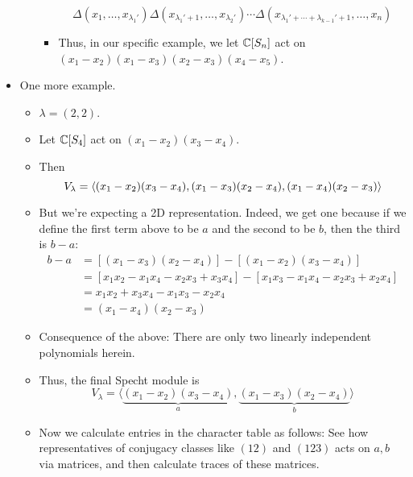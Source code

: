 \documentclass[../notes.tex]{subfiles}
\begin{document}
\begin{itemize}
\begin{itemize}
\begin{itemize}
            \begin{equation*}
                \Delta(x_1,\dots,x_{\lambda_1'})\Delta(x_{\lambda_1'+1},\dots,x_{\lambda_2'})\cdots\Delta(x_{\lambda_1'+\cdots+\lambda_{k-1}'+1},\dots,x_n)
            \end{equation*}
            \item Thus, in our specific example, we let $\mathbb{C}[S_n]$ act on $(x_1-x_2)(x_1-x_3)(x_2-x_3)(x_4-x_5)$.
        \end{itemize}
    \end{itemize}
    \item One more example.
    \begin{itemize}
        \item $\lambda=(2,2)$.
        \item Let $\mathbb{C}[S_4]$ act on $(x_1-x_2)(x_3-x_4)$.
        \item Then
        \begin{equation*}
            V_\lambda = \left\langle{(x_1-x_2)(x_3-x_4),(x_1-x_3)(x_2-x_4),(x_1-x_4)(x_2-x_3)}\right\rangle
        \end{equation*}
        \item But we're expecting a 2D representation. Indeed, we get one because if we define the first term above to be $a$ and the second to be $b$, then the third is $b-a$:
        \begin{align*}
            b-a &= [(x_1-x_3)(x_2-x_4)]-[(x_1-x_2)(x_3-x_4)]\\
            &= [x_1x_2-x_1x_4-x_2x_3+x_3x_4]-[x_1x_3-x_1x_4-x_2x_3+x_2x_4]\\
            &= x_1x_2+x_3x_4-x_1x_3-x_2x_4\\
            &= (x_1-x_4)(x_2-x_3)
        \end{align*}
        \item Consequence of the above: There are only two linearly independent polynomials herein.
        \item Thus, the final Specht module is
        \begin{equation*}
            V_\lambda = \langle\underbrace{(x_1-x_2)(x_3-x_4)}_a,\underbrace{(x_1-x_3)(x_2-x_4)}_b\rangle
        \end{equation*}
        \item Now we calculate entries in the character table as follows: See how representatives of conjugacy classes like $(12)$ and $(123)$ acts on $a,b$ via matrices, and then calculate traces of these matrices.
        \begin{itemize}

\end{itemize}
\end{itemize}
\end{itemize}
\end{document}
